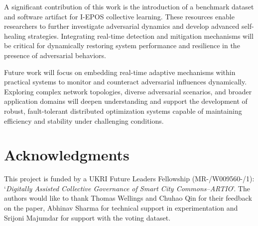 \documentclass[journal]{IEEEtran}
\begin{document}
A significant contribution of this work is the introduction of a benchmark dataset and software artifact for I-EPOS collective learning. These resources enable researchers to further investigate adversarial dynamics and develop advanced self-healing strategies. Integrating real-time detection and mitigation mechanisms will be critical for dynamically restoring system performance and resilience in the presence of adversarial behaviors.

Future work will focus on embedding real-time adaptive mechanisms within practical systems to monitor and counteract adversarial influences dynamically. Exploring complex network topologies, diverse adversarial scenarios, and broader application domains will deepen understanding and support the development of robust, fault-tolerant distributed optimization systems capable of maintaining efficiency and stability under challenging conditions.


\section*{Acknowledgments}
This project is funded by a UKRI Future Leaders Fellowship (MR-/W009560-/1): `\emph{Digitally Assisted Collective Governance of Smart City Commons--ARTIO}'.
The authors would like to thank Thomas Wellings and Chuhao Qin for their feedback on the paper, Abhinav Sharma for technical support in experimentation and Srijoni Majumdar for support with the voting dataset.



\end{document}
